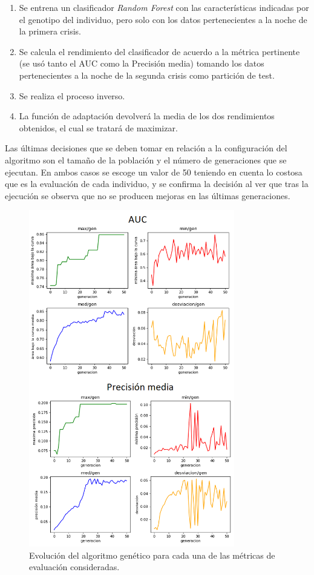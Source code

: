 \begin{minipage}{\linewidth}
\begin{enumerate}
	\item Se entrena un clasificador \textit{Random Forest} con las características indicadas por el genotipo del individuo, pero solo con los datos pertenecientes a la noche de la primera crisis. 
	\item Se calcula el rendimiento del clasificador de acuerdo a la métrica pertinente (se usó tanto el AUC como la Precisión media) tomando los datos pertenecientes a la noche de la segunda crisis como partición de test. 
	\item Se realiza el proceso inverso. 
	\item La función de adaptación devolverá la media de los dos rendimientos obtenidos, el cual se tratará de maximizar. 
\end{enumerate}
\end{minipage}

Las últimas decisiones que se deben tomar en relación a la configuración del algoritmo son el tamaño de la población y el número de generaciones que se ejecutan. En ambos casos se escoge un valor de 50 teniendo en cuenta lo costosa que es la evaluación de cada individuo, y se confirma la decisión al ver que tras la ejecución se observa que no se producen mejoras en las últimas generaciones. 

\begin{figure}
	\centering
	\includegraphics[width=0.8\textwidth]{../img/genetico.png}
	\caption{Evolución del algoritmo genético para cada una de las métricas de evaluación consideradas.}
	\label{fig:genetico}
\end{figure}

